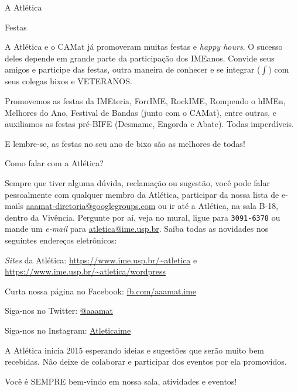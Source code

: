 \begin{secao}{A Atlética}
\begin{subsecao}{Festas}

A Atlética e o CAMat já promoveram muitas festas e \textit{happy hours}. O sucesso
deles depende em grande parte da participação dos IMEanos. Convide seus
amigos e participe das festas, outra maneira de conhecer e se
integrar ($\int$) com seus colegas bixos e VETERANOS.

Promovemos as festas da IMEteria, ForrIME, RockIME, Rompendo o hIMEn,
Melhores do Ano, Festival de Bandas (junto com o CAMat), entre outras, e
auxiliamos as festas pré-BIFE (Desmame, Engorda e Abate). Todas imperdíveis.

E lembre-se, as festas no seu ano de bixo são as melhores de todas!

\end{subsecao}

\begin{subsecao}{Como falar com a Atlética?}

Sempre que tiver alguma dúvida, reclamação ou sugestão, você pode falar
pessoalmente com qualquer membro da Atlética, participar da nossa lista de e-mails \url{aaamat-diretoria@googlegroups.com} ou ir até a Atlética, na sala
B-18, dentro da Vivência.  Pergunte por aí, veja no mural, ligue para {\tt 3091-6378} ou mande um \textit{e-mail} para \url{atletica@ime.usp.br}.
Saiba todas as novidades nos seguintes endereços eletrônicos:

\textit{Sites} da Atlética: \url{https://www.ime.usp.br/~atletica} e \url{https://www.ime.usp.br/~atletica/wordpress}

Curta nossa página no Facebook: \url{fb.com/aaamat.ime}

Siga-nos no Twitter: \url{@aaamat}

Siga-nos no Instagram: \url{Atleticaime}

A Atlética inicia 2015 esperando ideias e sugestões que serão muito bem %
recebidas. Não deixe de colaborar e participar dos eventos por ela promovidos.

Você é SEMPRE bem-vindo em nossa sala, atividades e eventos!

\end{subsecao}
\end{secao}
